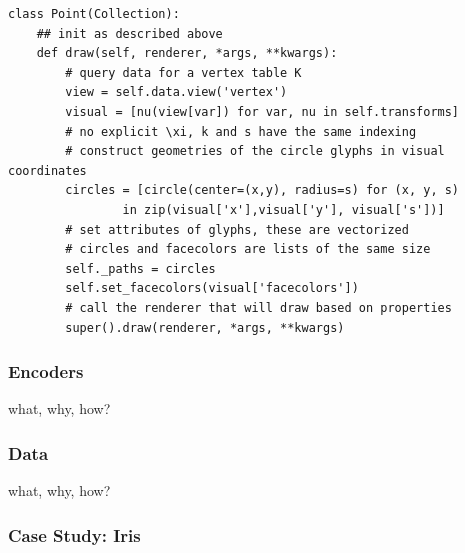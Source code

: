 \documentclass[../main.tex]{subfiles}
\begin{document}
\begin{verbatim}
class Point(Collection):
    ## init as described above
    def draw(self, renderer, *args, **kwargs):
        # query data for a vertex table K
        view = self.data.view('vertex') 
        visual = [nu(view[var]) for var, nu in self.transforms]
        # no explicit \xi, k and s have the same indexing
        # construct geometries of the circle glyphs in visual coordinates
        circles = [circle(center=(x,y), radius=s) for (x, y, s) 
                in zip(visual['x'],visual['y'], visual['s'])] 
        # set attributes of glyphs, these are vectorized 
        # circles and facecolors are lists of the same size
        self._paths = circles
        self.set_facecolors(visual['facecolors'])
        # call the renderer that will draw based on properties
        super().draw(renderer, *args, **kwargs)
\end{verbatim}

\subsubsection{Encoders \vchannel}
what, why, how?
\subsubsection{Data \dtotal}
what, why, how?

\subsubsection{Case Study: Iris}
\end{document}
